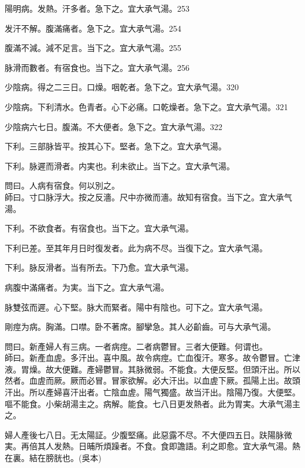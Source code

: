 \documentclass[b5paper,twoside,zihao=-4,UTF8]{ctexbook}
\begin{document}
陽明病。发熱。汗多者。急下之。宜{大}承气湯。253

发汗不解。腹滿痛者。急下之。宜{大}承气湯。254

腹滿不減。減不足言。当下之。宜{大}承气湯。255

脉滑而數者。有宿食也。当下之。宜{大}承气湯。256

少陰病。得之二三日。口燥。咽乾者。急下之。宜{大}承气湯。320

少陰病。{下}利清水。色青者。心下必痛。口乾燥者。急下之。宜{大}承气湯。321

少陰病六七日。腹滿。不大便者。急下之。宜{大}承气湯。322

下利。三部脉皆平。按其心下。堅者。急下之。宜{大}承气湯。

下利。脉遲而滑者。{内}実也。利未欲止。当下之。宜{大}承气湯。

問曰。人病有宿食。何以別之。\\
師曰。寸口脉浮大。按之反濇。尺中亦微而濇。故知有宿食。当下之。宜{大}承气湯。

下利。不欲食者。有宿食也。当下之。宜{大}承气湯。

下利{已}差。至其{年月日}时復发者。此为病不尽。当復下之。宜{大}承气湯。

下利。脉反滑者。当有所去。下乃愈。宜大承气湯。

病腹中滿痛者。为実。当下之。宜大承气湯。

脉雙弦而遲。心下堅。脉大而緊者。陽中有陰也。可下之。宜{大}承气湯。

{剛}痙为病。胸滿。口噤。卧不著席。腳攣急。其人必齘齒。可与大承气湯。

問曰。新產婦人有三病。一者病痙。二者病鬱冒。三者大便難。何谓也。\\
師曰。新產血虗。多汗出。喜中風。故令病痙。亡血復汗。寒多。故令鬱冒。亡津液。胃燥。故大便難。產婦鬱冒。其脉微弱。不能食。大便反堅。但頭汗出。所以然者。血虗而厥。厥而必冒。冒家欲解。必大汗出。以血虗下厥。孤陽上出。故頭汗出。所以產婦喜汗出者。亡陰血虗。陽气獨盛。故当汗出。陰陽乃復。大便堅。嘔不能食。小柴胡湯主之。病解。能食。七八日更发熱者。此为胃実。大承气湯主之。

婦人產後七八日。无太陽証。少腹堅痛。此惡露不尽。不大便四五日。趺陽脉微実。再倍其人发熱。日晡所煩躁者。不食。食即譫語。利之即愈。宜大承气湯。熱在裏。結在膀胱也。(吳本)
\end{document}
